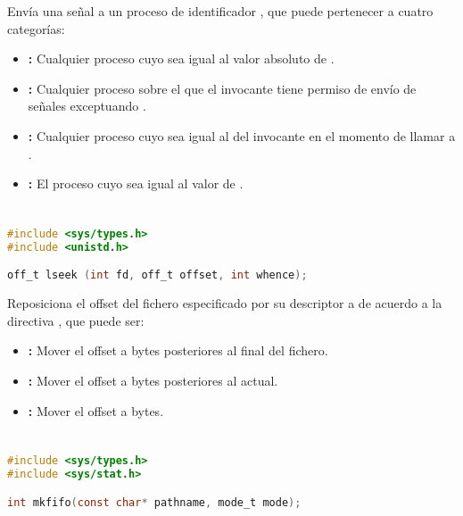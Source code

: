 Envía una señal  a un proceso de identificador , que puede pertenecer a cuatro categorías:

\begin{itemize}
	\item{}\textbf{:} Cualquier proceso cuyo  sea igual al valor absoluto de .
	\item{}\textbf{:} Cualquier proceso sobre el que el invocante tiene permiso de envío de señales exceptuando .
	\item{}\textbf{:} Cualquier proceso cuyo  sea igual al del invocante en el momento de llamar a .
	\item{}\textbf{:} El proceso cuyo  sea igual al valor de .
\end{itemize}

\section{}\label{lseek}

\begin{lstlisting}[language=C]
#include <sys/types.h>
#include <unistd.h>

off_t lseek (int fd, off_t offset, int whence);
\end{lstlisting}

Reposiciona el offset del fichero especificado por su descriptor  a  de acuerdo a la directiva , que puede ser:

\begin{itemize}
	\item{}\textbf{:} Mover el offset a  bytes posteriores al final del fichero.
	\item{}\textbf{:} Mover el offset a  bytes posteriores al actual.
	\item{}\textbf{:} Mover el offset a  bytes.
\end{itemize}

\section{}\label{mkfifo}

\begin{lstlisting}[language=C]
#include <sys/types.h>
#include <sys/stat.h>

int mkfifo(const char* pathname, mode_t mode);
\end{lstlisting}

